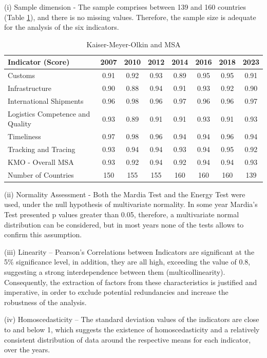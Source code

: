 \documentclass[sigconf]{acmart}
\begin{document}
(i) Sample dimension - The sample comprises between 139 and 160 countries (Table \ref{tab:kmo}), and there is no missing values. Therefore, the sample size is adequate for the analysis of the six indicators.

\begin{table}[h]
  \caption{Kaiser-Meyer-Olkin and MSA}
  \label{tab:kmo}
\begin{tabular}{lccccccc}
\toprule
\textbf{Indicator (Score)}	&	\textbf{2007}	&	\textbf{2010}	&	\textbf{2012}	&	\textbf{2014}	&	\textbf{2016}	&	\textbf{2018}	&	\textbf{2023}	\\  
\midrule
Customs	&	0.91	&	0.92	&	0.93	&	0.89	&	0.95	&	0.95	&	0.91	\\	
Infrastructure	&	0.90	&	0.88	&	0.94	&	0.91	&	0.93	&	0.92	&	0.90	\\	 
International Shipments	&	0.96	&	0.98	&	0.96	&	0.97	&	0.96	&	0.96	&	0.97	\\	 
Logistics Competence and Quality	&	0.93	&	0.89	&	0.91	&	0.91	&	0.93	&	0.91	&	0.93	\\	 
Timeliness	&	0.97	&	0.98	&	0.96	&	0.94	&	0.94	&	0.96	&	0.94	\\	 
Tracking and Tracing	&	0.93	&	0.94	&	0.94	&	0.93	&	0.94	&	0.95	&	0.92	\\	 
\midrule
KMO - Overall MSA	&	0.93	&	0.92	&	0.94	&	0.92	&	0.94	&	0.94	&	0.93	\\	 
\midrule
Number of Countries	&	150	&	155	&	155	&	160	&	160	&	160	&	139\\	
\bottomrule
\end{tabular}
\end{table}

(ii) Normality Assessment - Both the Mardia Test and the Energy Test were used, under the null hypothesis of multivariate normality.
In some year Mardia's Test presented p values greater than 0.05, therefore, a multivariate normal distribution can be considered, but in most years none of the tests allows to confirm this assumption.

(iii) Linearity -- Pearson's Correlations between Indicators are significant at the 5\% significance level, in addition, they are all high, exceeding the value of 0.8, suggesting a strong interdependence between them (multicollinearity).
Consequently, the extraction of factors from these characteristics is justified and imperative, in order to exclude potential redundancies and increase the robustness of the analysis.

(iv) Homoscedasticity -- The standard deviation values of the indicators are close to and below 1, which suggests the existence of homoscedasticity and a relatively consistent distribution of data around the respective means for each indicator, over the years.
\end{document}
